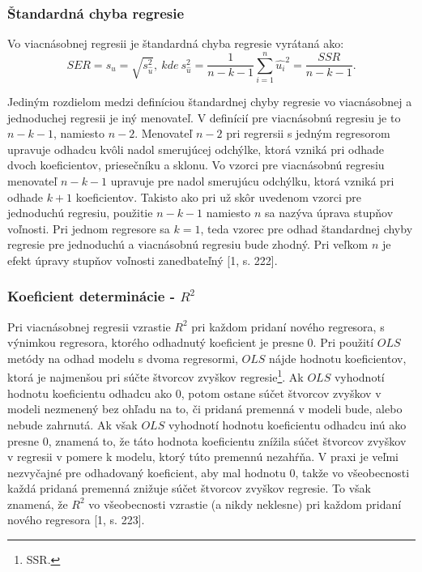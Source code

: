 \documentclass[]{tukediphc}
\begin{document}
\subsubsection{Štandardná chyba regresie}

Vo viacnásobnej regresii je štandardná chyba regresie vyrátaná ako:
\begin{equation}
    SER = s_{\hat{u}} = \sqrt{s_{\hat{u}}^2},  \ kde \  s_{\hat{u}}^2 =\frac{1}{n-k-1}\sum_{i=1}^{n}\hat{u_{i}}^2 = \frac{SSR}{n-k-1}.
\end{equation}

Jediným rozdielom medzi definíciou štandardnej chyby regresie vo viacnásobnej a jednoduchej regresii je iný menovateľ. V definícií pre viacnásobnú regresiu je to $n - k - 1$, namiesto $n - 2$. Menovateľ $n - 2$ pri regrersii s jedným regresorom upravuje odhadcu kvôli nadol smerujúcej odchýlke, ktorá vzniká pri odhade dvoch koeficientov, priesečníku a sklonu. Vo vzorci pre viacnásobnú regresiu menovateľ $n - k - 1$ upravuje pre nadol smerujúcu odchýlku, ktorá vzniká pri odhade $k + 1$ koeficientov. Takisto ako pri už skôr uvedenom vzorci pre jednoduchú regresiu, použitie $n - k - 1$ namiesto $n$ sa nazýva úprava stupňov voľnosti. Pri jednom regresore sa $k = 1$, teda vzorec pre odhad štandardnej chyby regresie pre jednoduchú a viacnásobnú regresiu bude zhodný. Pri veľkom $n$ je efekt úpravy stupňov voľnosti zanedbateľný [1, s. 222].   

\subsubsection{Koeficient determinácie - $R^2$}

Pri viacnásobnej regresii vzrastie $R^2$ pri každom pridaní nového regresora, s výnimkou regresora, ktorého odhadnutý koeficient je presne 0. Pri použití $OLS$ metódy na odhad modelu s dvoma regresormi, $OLS$ nájde hodnotu koeficientov, ktorá je najmenšou pri súčte štvorcov zvyškov regresie\footnote{SSR.}. Ak $OLS$ vyhodnotí hodnotu koeficientu odhadcu ako 0, potom ostane súčet štvorcov zvyškov v modeli nezmenený bez ohľadu na to, či pridaná premenná v modeli bude, alebo nebude zahrnutá. Ak však $OLS$ vyhodnotí hodnotu koeficientu odhadcu inú ako presne 0, znamená to, že táto hodnota koeficientu znížila súčet štvorcov zvyškov v regresii v pomere k modelu, ktorý túto premennú nezahŕňa. V praxi je veľmi nezvyčajné pre odhadovaný koeficient, aby mal hodnotu 0, takže vo všeobecnosti každá pridaná premenná znižuje súčet štvorcov zvyškov regresie. To však znamená, že $R^2$ vo všeobecnosti vzrastie (a nikdy neklesne) pri každom pridaní nového regresora [1, s. 223]. 
\end{document}

